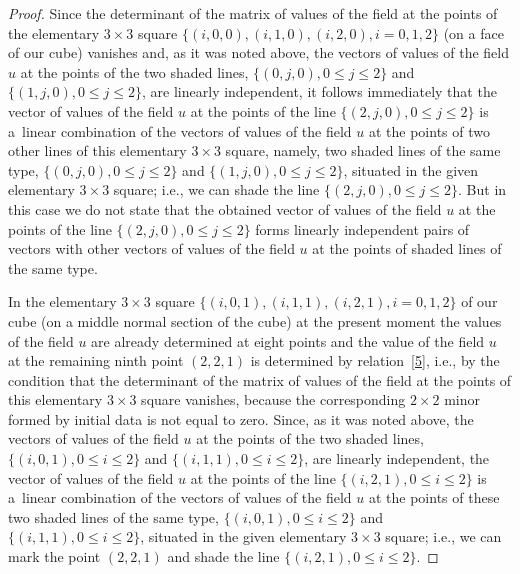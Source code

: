 \documentclass[pdftex]{sigma}
\begin{document}
\begin{proof}
Since the determinant of the matrix of values of the f\/ield at the
points of the elementary $3 \times 3$ square $\{(i, 0, 0), (i, 1,
0), (i, 2, 0), i = 0, 1, 2\}$ (on a face of our cube) vanishes and,
as it was noted above, the vectors of values of the f\/ield $u$ at the
points of the two shaded lines, $\{(0, j, 0), 0 \leq j \leq 2\}$ and
$\{(1, j, 0), 0 \leq j \leq 2\}$, are linearly independent, it
follows immediately that the vector of values of the f\/ield $u$ at
the points of the line $\{(2, j, 0), 0 \leq j \leq 2\}$ is a~linear
combination of the vectors of values of the f\/ield $u$ at the points
of two other lines of this elementary $3 \times 3$ square, namely,
two shaded lines of the same type, $\{(0, j, 0), 0 \leq j \leq 2\}$
and $\{(1, j, 0), 0 \leq j \leq 2\}$, situated in the given
elementary $3 \times 3$ square; i.e., we can shade the line $\{(2,
j, 0), 0 \leq j \leq 2\}$. But in this case we do not state that the
obtained vector of values of the f\/ield $u$ at the points of the line
$\{(2, j, 0), 0 \leq j \leq 2\}$ forms linearly independent pairs of
vectors with other vectors of values of the f\/ield $u$ at the points
of shaded lines of the same type.


In the elementary $3 \times 3$ square $\{(i, 0, 1), (i, 1, 1), (i,
2, 1), i = 0, 1, 2\}$ of our cube (on a middle normal section of the
cube) at the present moment the values of the f\/ield $u$ are already
determined at eight points and the value of the f\/ield $u$ at the
remaining ninth point $(2, 2, 1)$ is determined by relation~\eqref{5},
i.e., by the condition that the determinant of the
matrix of values of the f\/ield at the points of this elementary $3
\times 3$ square vanishes, because the corresponding $2 \times 2$
minor formed by initial data is not equal to zero. Since, as it was
noted above, the vectors of values of the f\/ield $u$ at the points of
the two shaded lines, $\{(i, 0, 1), 0 \leq i \leq 2\}$ and $\{(i, 1,
1), 0 \leq i \leq 2\}$, are linearly independent, the vector of
values of the f\/ield $u$ at the points of the line $\{(i, 2, 1), 0
\leq i \leq 2\}$ is a~linear combination of the vectors of values of
the f\/ield $u$ at the points of these two shaded lines of the same
type, $\{(i, 0, 1), 0 \leq i \leq 2\}$ and $\{(i, 1, 1), 0 \leq i
\leq 2\}$, situated in the given elementary $3 \times 3$ square;
i.e., we can mark the point $(2, 2, 1)$ and shade the line $\{(i, 2,
1), 0 \leq i \leq 2\}$.





\end{proof}
\end{document}
